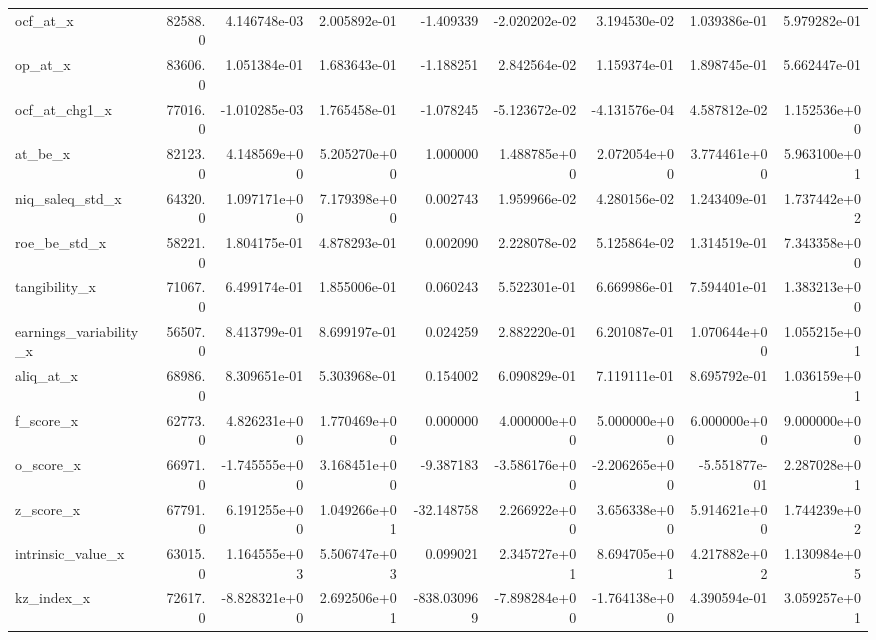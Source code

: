 \documentclass[10pt]{article}
\begin{document}
\begin{landscape}
\begin{longtable}{lrrrrrrrr}
ocf\_at\_x                &   82588.0 &  4.146748e-03 &  2.005892e-01 &     -1.409339 & -2.020202e-02 &  3.194530e-02 &  1.039386e-01 &  5.979282e-01 \\
op\_at\_x                 &   83606.0 &  1.051384e-01 &  1.683643e-01 &     -1.188251 &  2.842564e-02 &  1.159374e-01 &  1.898745e-01 &  5.662447e-01 \\
ocf\_at\_chg1\_x           &   77016.0 & -1.010285e-03 &  1.765458e-01 &     -1.078245 & -5.123672e-02 & -4.131576e-04 &  4.587812e-02 &  1.152536e+00 \\
at\_be\_x                 &   82123.0 &  4.148569e+00 &  5.205270e+00 &      1.000000 &  1.488785e+00 &  2.072054e+00 &  3.774461e+00 &  5.963100e+01 \\
niq\_saleq\_std\_x         &   64320.0 &  1.097171e+00 &  7.179398e+00 &      0.002743 &  1.959966e-02 &  4.280156e-02 &  1.243409e-01 &  1.737442e+02 \\
roe\_be\_std\_x            &   58221.0 &  1.804175e-01 &  4.878293e-01 &      0.002090 &  2.228078e-02 &  5.125864e-02 &  1.314519e-01 &  7.343358e+00 \\
tangibility\_x           &   71067.0 &  6.499174e-01 &  1.855006e-01 &      0.060243 &  5.522301e-01 &  6.669986e-01 &  7.594401e-01 &  1.383213e+00 \\
earnings\_variability\_x  &   56507.0 &  8.413799e-01 &  8.699197e-01 &      0.024259 &  2.882220e-01 &  6.201087e-01 &  1.070644e+00 &  1.055215e+01 \\
aliq\_at\_x               &   68986.0 &  8.309651e-01 &  5.303968e-01 &      0.154002 &  6.090829e-01 &  7.119111e-01 &  8.695792e-01 &  1.036159e+01 \\
f\_score\_x               &   62773.0 &  4.826231e+00 &  1.770469e+00 &      0.000000 &  4.000000e+00 &  5.000000e+00 &  6.000000e+00 &  9.000000e+00 \\
o\_score\_x               &   66971.0 & -1.745555e+00 &  3.168451e+00 &     -9.387183 & -3.586176e+00 & -2.206265e+00 & -5.551877e-01 &  2.287028e+01 \\
z\_score\_x               &   67791.0 &  6.191255e+00 &  1.049266e+01 &    -32.148758 &  2.266922e+00 &  3.656338e+00 &  5.914621e+00 &  1.744239e+02 \\
intrinsic\_value\_x       &   63015.0 &  1.164555e+03 &  5.506747e+03 &      0.099021 &  2.345727e+01 &  8.694705e+01 &  4.217882e+02 &  1.130984e+05 \\
kz\_index\_x              &   72617.0 & -8.828321e+00 &  2.692506e+01 &   -838.030969 & -7.898284e+00 & -1.764138e+00 &  4.390594e-01 &  3.059257e+01 \\

\end{longtable}
\end{landscape}
\end{document}
